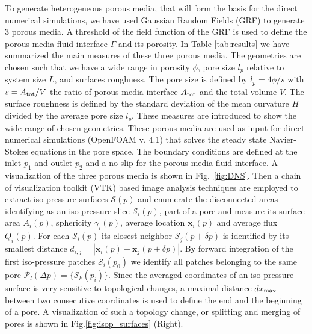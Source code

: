 \documentclass[draft]{agujournal2019}
\begin{document}
To generate heterogeneous porous media, that will form the basis for the direct numerical simulations, we have used Gaussian Random Fields (GRF) to generate 3 porous media. A threshold of the field function of the GRF is used to define the porous media-fluid interface $\Gamma$ and its porosity. In Table \ref{tab:results} we have summarized the main measures of these three porous media. The geometries are chosen such that we have a wide range in porosity $\phi$, pore size $l_p$ relative to system size $L$, and surfaces roughness. The pore size is defined by $l_p = 4 \phi/s$ with $s= A_{\rm{tot}}/V$ the ratio of porous media interface $A_{\rm{tot}}$ and the total volume $V$. The surface roughness is defined by the standard deviation of the mean curvature $H$ divided by the average pore size $l_p$. These measures are introduced to show the wide range of chosen geometries. These porous media are used as input for direct numerical simulations (OpenFOAM v. 4.1) \cite{weller_tensorial_1998} that solves the steady state Navier-Stokes equations in the pore space. The boundary conditions are defined at the inlet $p_1$ and outlet $p_2$ and a no-slip for the porous media-fluid interface. A visualization of the three porous media is shown in Fig.~\ref{fig:DNS}. Then a chain of visualization toolkit (VTK) based image analysis techniques \cite{schroeder_visualization_2006,hernderson_paraview_2007} are employed to extract iso-pressure surfaces $\mathcal{S}(p)$ and enumerate the disconnected areas identifying as an iso-pressure slice $\mathcal{S}_i(p)$, part of a pore and measure its surface area $A_i(p)$, sphericity $\gamma_i(p)$, average location $\mathbf{x}_i(p)$ and average flux $Q_i(p)$. For each $\mathcal{S}_i(p)$ its closest neighbor $\mathcal{S}_j(p+\delta p)$ is identified by its smallest distance $d_{i,j}= \left|  \mathbf{x}_i(p)-\mathbf{x}_j(p+\delta p)\right|$. By forward integration of the first iso-pressure patches $\mathcal{S}_i(p_0)$ we identify all patches belonging to the same pore $\mathcal{P}_l(\Delta p) = \{\mathcal{S}_k(p_i)\}$. Since the averaged coordinates of an iso-pressure surface is very sensitive to topological changes, a maximal distance $dx_{\rm{max}}$ between two consecutive coordinates is used to define the end and the beginning of a pore. A visualization of such a topology change, or splitting and merging of pores is shown in Fig.\ref{fig:isop_surfaces} (Right).
\end{document}
